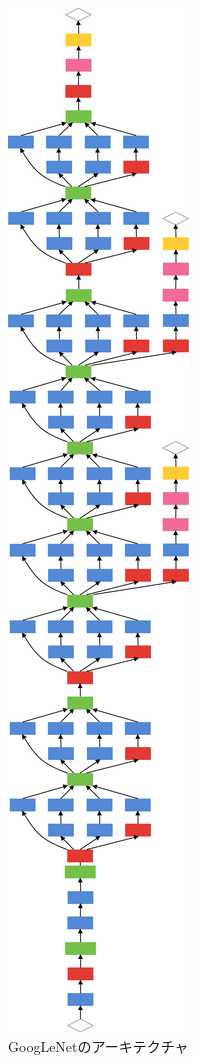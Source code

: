 {\begin{figure}[h]
  \centering
  \includegraphics[scale=0.2]{./chap2/fig/googlenet.png}
  \caption{GoogLeNetのアーキテクチャ}
  \label{fig:googlenet}
\end{figure}

}
